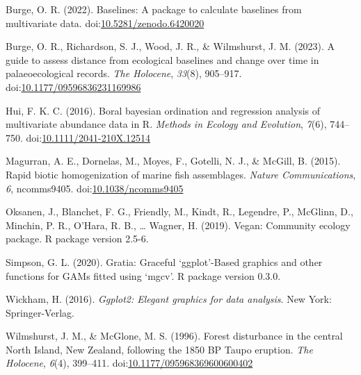 \documentclass[nofonts,]{tufte-handout}
\newlength{\cslhangindent}
\newenvironment{CSLReferences}[2]%
  {\setlength{\parindent}{0pt}%
  \everypar{\setlength{\hangindent}{\cslhangindent}}\ignorespaces}%
  {\par}
\begin{document}
\hypertarget{refs}{}
\begin{CSLReferences}{0}{5}
\leavevmode{}%
Burge, O. R. (2022). Baselines: {A} package to calculate baselines from
multivariate data.
doi:\href{https://doi.org/10.5281/zenodo.6420020}{10.5281/zenodo.6420020}

\leavevmode{}%
Burge, O. R., Richardson, S. J., Wood, J. R., \& Wilmshurst, J. M.
(2023). A guide to assess distance from ecological baselines and change
over time in palaeoecological records. \emph{The Holocene},
\emph{33}(8), 905--917.
doi:\href{https://doi.org/10.1177/09596836231169986}{10.1177/09596836231169986}

\leavevmode{}%
Hui, F. K. C. (2016). Boral \textendash{} bayesian ordination and
regression analysis of multivariate abundance data in {R}. \emph{Methods
in Ecology and Evolution}, \emph{7}(6), 744--750.
doi:\href{https://doi.org/10.1111/2041-210X.12514}{10.1111/2041-210X.12514}

\leavevmode{}%
Magurran, A. E., Dornelas, M., Moyes, F., Gotelli, N. J., \& McGill, B.
(2015). Rapid biotic homogenization of marine fish assemblages.
\emph{Nature Communications}, \emph{6}, ncomms9405.
doi:\href{https://doi.org/10.1038/ncomms9405}{10.1038/ncomms9405}

\leavevmode{}%
Oksanen, J., Blanchet, F. G., Friendly, M., Kindt, R., Legendre, P.,
McGlinn, D., Minchin, P. R., O'Hara, R. B., \ldots{} Wagner, H. (2019).
Vegan: {Community} ecology package. {R} package version 2.5-6.

\leavevmode{}%
Simpson, G. L. (2020). Gratia: Graceful {`ggplot'}-{Based} graphics and
other functions for {GAMs} fitted using {`mgcv'}. {R} package version
0.3.0.

\leavevmode{}%
Wickham, H. (2016). \emph{Ggplot2: Elegant graphics for data analysis}.
{New York}: {Springer-Verlag}.

\leavevmode{}%
Wilmshurst, J. M., \& McGlone, M. S. (1996). Forest disturbance in the
central {North Island}, {New Zealand}, following the 1850 {BP Taupo}
eruption. \emph{The Holocene}, \emph{6}(4), 399--411.
doi:\href{https://doi.org/10.1177/095968369600600402}{10.1177/095968369600600402}

\end{CSLReferences}
\end{document}
